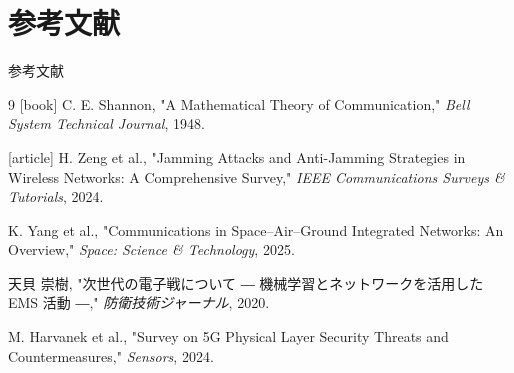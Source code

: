 \documentclass[11pt, aspectratio=169]{beamer}
\begin{document}
\section{参考文献}

\begin{frame}[allowframebreaks]{参考文献}
  \begin{thebibliography}{9}
    [book]
      C. E. Shannon, "A Mathematical Theory of Communication," 
      \textit{Bell System Technical Journal}, 1948.
      
    [article]
      H. Zeng et al., "Jamming Attacks and Anti-Jamming Strategies in Wireless Networks: A Comprehensive Survey," 
      \textit{IEEE Communications Surveys \& Tutorials}, 2024.
      
      K. Yang et al., "Communications in Space–Air–Ground Integrated Networks: An Overview," 
      \textit{Space: Science \& Technology}, 2025.
      
      天貝 崇樹, "次世代の電子戦について ― 機械学習とネットワークを活用した EMS 活動 ―," 
      \textit{防衛技術ジャーナル}, 2020.
      
      M. Harvanek et al., "Survey on 5G Physical Layer Security Threats and Countermeasures," 
      \textit{Sensors}, 2024.
  \end{thebibliography}
\end{frame}
\end{document}
